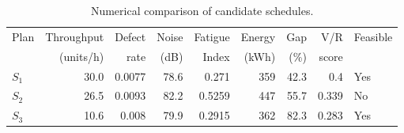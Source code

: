 \begin{table}[htbp]
\centering
\caption{Numerical comparison of candidate schedules.}
\label{tab:numerical-sim}
\small
\begin{tabular}{@{}lrrrrrrrl@{}}
\toprule
Plan & Throughput & Defect & Noise & Fatigue & Energy & Gap & V/R & Feasible \\
     & (units/h)  & rate   & (dB)  & Index   & (kWh)  & (\%) & score &         \\
\midrule
$S_{1}$ & 30.0 & 0.0077 & 78.6 & 0.271 & 359 & 42.3 & 0.4 & Yes \\
$S_{2}$ & 26.5 & 0.0093 & 82.2 & 0.5259 & 447 & 55.7 & 0.339 & No \\
$S_{3}$ & 10.6 & 0.008 & 79.9 & 0.2915 & 362 & 82.3 & 0.283 & Yes \\
\bottomrule
\end{tabular}
\end{table}
